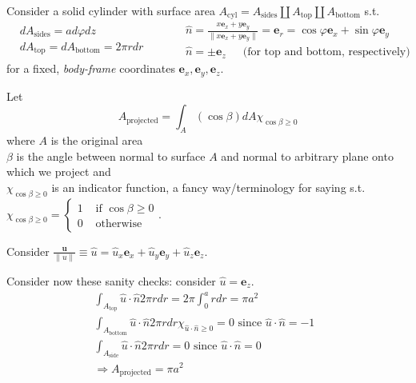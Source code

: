 \documentclass[10pt]{amsart}
\begin{document}
\begin{multicols*}{2}
Consider a solid cylinder with surface area $A_{\text{cyl}} = A_{\text{sides}} \coprod A_{\text{top}} \coprod A_{\text{bottom} }$ s.t. 
\[
\begin{aligned}
  & dA_{\text{sides}} = ad\varphi dz \\ 
  & dA_{\text{top}} = dA_{\text{bottom}} = 2\pi r dr 
\end{aligned} \quad \quad \, \begin{aligned}
  & \widehat{n} = \frac{ x\mathbf{e}_x + y\mathbf{e}_y }{ \| x \mathbf{e}_x + y \mathbf{e}_y \| } = \mathbf{e}_r = \cos{\varphi} \mathbf{e}_x + \sin{\varphi} \mathbf{e}_y \\ 
  &  \widehat{n} = \pm \mathbf{e}_z \quad \, \text{ (for top and bottom, respectively) }
\end{aligned}
\]
for a fixed, \emph{body-frame} coordinates $\mathbf{e}_x ,\mathbf{e}_y, \mathbf{e}_z$.  

Let 
\[
A_{\text{projected}} = \int_A (\cos{\beta}) dA \chi_{\cos{\beta}\geq 0}
\]
where $A$ is the original area \\
\phantom{where} $\beta$ is the angle between normal to surface $A$ and normal to arbitrary plane onto which we project and \\
\phantom{where} $\chi_{\cos{\beta} \geq 0}$ is an indicator function, a fancy way/terminology for saying s.t. $\chi_{\cos{\beta}\geq 0} = \begin{cases} 1 & \text{ if } \cos{\beta} \geq 0 \\
  0 & \text{ otherwise } \end{cases}$.  

Consider $\frac{ \mathbf{u}}{ \| u \| } \equiv \widehat{u} = \widehat{u}_x \mathbf{e}_x + \widehat{u}_y \mathbf{e}_y + \widehat{u}_z \mathbf{e}_z$.  

Consider now these sanity checks: consider $\widehat{u} = \mathbf{e}_z$.  \[
\begin{gathered}
  \int_{A_{\text{top}} } \widehat{u} \cdot \widehat{n} 2\pi r dr = 2\pi \int_0^a r dr = \pi a^2 \\
  \int_{A_{\text{bottom}} } \widehat{u} \cdot \widehat{n} 2\pi r dr \chi_{\widehat{u}\cdot \widehat{n} \geq 0 } = 0 \text{ since $\widehat{u} \cdot  \widehat{n} = -1$ } \\
  \int_{A_{\text{side}}} \widehat{u} \cdot \widehat{n} 2\pi r dr = 0 \text{ since $\widehat{u} \cdot \widehat{n} = 0$ } \\
  \Longrightarrow A_{\text{projected}} = \pi a^2
\end{gathered}
\]


\end{multicols*}
\end{document}
